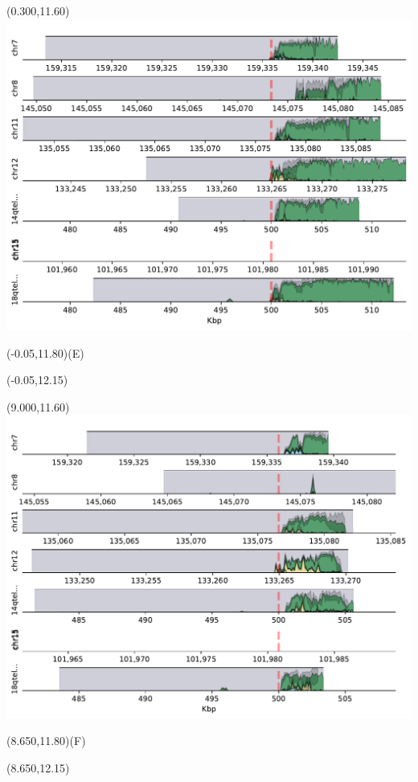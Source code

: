 \documentclass{article}
\begin{document}
\begin{textblock}{13}(0.300,11.60)\includegraphics{Figure_S3/HG006/densityplot-q_arm.pdf}\end{textblock}
\begin{textblock}{13}(-0.05,11.80)\LARGE{(E)}\end{textblock}
\begin{textblock}{13}(-0.05,12.15)\end{textblock}

\begin{textblock}{13}(9.000,11.60)\includegraphics{Figure_S3/HG007/densityplot-q_arm.pdf}\end{textblock}
\begin{textblock}{13}(8.650,11.80)\LARGE{(F)}\end{textblock}
\begin{textblock}{13}(8.650,12.15)\end{textblock}
\end{document}
